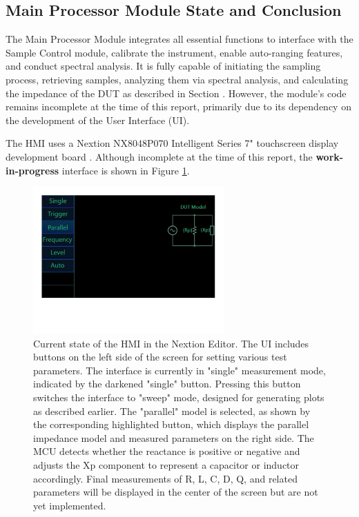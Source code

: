 \subsection{Main Processor Module State and Conclusion} \label{subsec:MCUConclusion}

The Main Processor Module integrates all essential functions to interface with the Sample Control module, calibrate the instrument, enable auto-ranging features, and conduct spectral analysis. It is fully capable of initiating the sampling process, retrieving samples, analyzing them via spectral analysis, and calculating the impedance of the DUT as described in Section . However, the module's code remains incomplete at the time of this report, primarily due to its dependency on the development of the User Interface (UI).

The HMI uses a Nextion NX8048P070 Intelligent Series 7" touchscreen display development board \cite{NextionDisplay}. Although incomplete at the time of this report, the \textbf{work-in-progress} interface is shown in Figure \ref{fig:7_3_3_NextionHMI}.

\begin{figure}[H] \centering \includegraphics[clip, trim=0 150 0 0, width=0.65\textwidth]{Sections/7_SystemDesign/Figures/7_3_3_UIStatus.pdf} \caption{Current state of the HMI in the Nextion Editor. The UI includes buttons on the left side of the screen for setting various test parameters. The interface is currently in "single" measurement mode, indicated by the darkened "single" button. Pressing this button switches the interface to "sweep" mode, designed for generating plots as described earlier. The "parallel" model is selected, as shown by the corresponding highlighted button, which displays the parallel impedance model and measured parameters on the right side. The MCU detects whether the reactance is positive or negative and adjusts the Xp component to represent a capacitor or inductor accordingly. Final measurements of R, L, C, D, Q, and related parameters will be displayed in the center of the screen but are not yet implemented.} \label{fig:7_3_3_NextionHMI} \end{figure}

